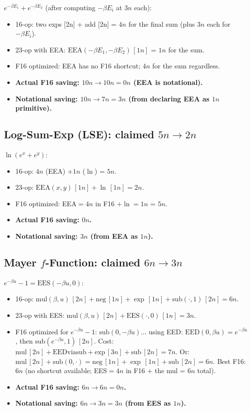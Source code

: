 \documentclass[11pt]{article}
\begin{document}
$e^{-\beta E_1} + e^{-\beta E_2}$ (after computing $-\beta E_i$ at $3n$ each):
\begin{itemize}
  \item 16-op: two exps [2n] + add [2n] = $4n$ for the final sum (plus $3n$ each for $-\beta E_i$).
  \item 23-op with EEA: $\mathrm{EEA}(-\beta E_1,-\beta E_2)\,[1n]$ = $1n$ for the sum.
  \item F16 optimized: EEA has no F16 shortcut; $4n$ for the sum regardless.
  \item \textbf{Actual F16 saving: $10n\to10n = 0n$ (EEA is notational).}
  \item \textbf{Notational saving: $10n\to7n = 3n$ (from declaring EEA as $1n$ primitive).}
\end{itemize}

\subsection{Log-Sum-Exp (LSE): claimed $5n\to2n$}

$\ln(e^x+e^y)$:
\begin{itemize}
  \item 16-op: $4n$ (EEA) $+ 1n$ ($\ln$) = $5n$.
  \item 23-op: $\mathrm{EEA}(x,y)\,[1n] + \ln\,[1n] = 2n$.
  \item F16 optimized: EEA$=4n$ in F16 $+\ln=1n$ = $5n$.
  \item \textbf{Actual F16 saving: $0n$.}
  \item \textbf{Notational saving: $3n$ (from EEA as $1n$).}
\end{itemize}

\subsection{Mayer $f$-Function: claimed $6n\to3n$}

$e^{-\beta u}-1 = \mathrm{EES}(-\beta u, 0)$:
\begin{itemize}
  \item 16-op: $\mathrm{mul}(\beta,u)\,[2n] + \mathrm{neg}\,[1n] + \exp\,[1n] + \mathrm{sub}(\cdot,1)\,[2n] = 6n$.
  \item 23-op with EES: $\mathrm{mul}(\beta,u)\,[2n] + \mathrm{EES}(\cdot,0)\,[1n] = 3n$.
  \item F16 optimized for $e^{-\beta u}-1$:
    $\mathrm{sub}(0,-\beta u)$... using EED: $\mathrm{EED}(0,\beta u)=e^{-\beta u}$,
    then $\mathrm{sub}(e^{-\beta u},1)\,[2n]$. Cost: $\mathrm{mul}\,[2n]+\mathrm{EED via sub+exp}\,[3n]+\mathrm{sub}\,[2n]=7n$.
    Or: $\mathrm{mul}\,[2n]+\mathrm{sub}(0,\cdot)=\mathrm{neg}\,[1n]+\exp\,[1n]+\mathrm{sub}\,[2n]=6n$.
    Best F16: $6n$ (no shortcut available; EES$=4n$ in F16 $+$ the mul = $6n$ total).
  \item \textbf{Actual F16 saving: $6n\to6n = 0n$.}
  \item \textbf{Notational saving: $6n\to3n = 3n$ (from EES as $1n$).}
\end{itemize}
\end{document}
